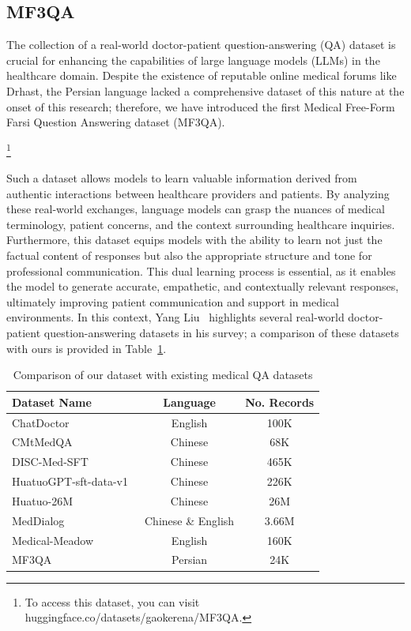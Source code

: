 \documentclass[review]{elsarticle}
\begin{document}
\subsection{MF3QA}

The collection of a real-world doctor-patient question-answering (QA) dataset is crucial for enhancing the capabilities of large language models (LLMs) in the healthcare domain. Despite the existence of reputable online medical forums like Drhast, the Persian language lacked a comprehensive dataset of this nature at the onset of this research; therefore, we have introduced the first Medical Free-Form Farsi Question Answering dataset (MF3QA).

\footnote{To access this dataset, you can visit huggingface.co/datasets/gaokerena/MF3QA.}

Such a dataset allows models to learn valuable information derived from authentic interactions between healthcare providers and patients. By analyzing these real-world exchanges, language models can grasp the nuances of medical terminology, patient concerns, and the context surrounding healthcare inquiries. Furthermore, this dataset equips models with the ability to learn not just the factual content of responses but also the appropriate structure and tone for professional communication. This dual learning process is essential, as it enables the model to generate accurate, empathetic, and contextually relevant responses, ultimately improving patient communication and support in medical environments. In this context, Yang Liu~\cite{b15} highlights several real-world doctor-patient question-answering datasets in his survey; a comparison of these datasets with ours is provided in Table~\ref{mf3qa_comparison}.

\begin{table}[ht]
    \centering
    \begin{tabular}{|l|c|c|}
        \hline
        \textbf{Dataset Name} & \textbf{Language} & \textbf{No. Records}  \\ \hline
        ChatDoctor~\cite{b16} & English & 100K \\ \hline
        CMtMedQA~\cite{b17} & Chinese & 68K  \\ \hline
        DISC-Med-SFT~\cite{b18} & Chinese & 465K \\ \hline
        HuatuoGPT-sft-data-v1~\cite{b19} & Chinese & 226K  \\ \hline
        Huatuo-26M~\cite{b20} & Chinese & 26M  \\ \hline
        MedDialog~\cite{b21} & Chinese \& English & 3.66M  \\ \hline
        Medical-Meadow~\cite{b22} & English & 160K  \\ \hline
        MF3QA & Persian & 24K\\ \hline
    \end{tabular}
    \caption{Comparison of our dataset with existing medical QA datasets}
    \label{mf3qa_comparison}
\end{table}
\end{document}
